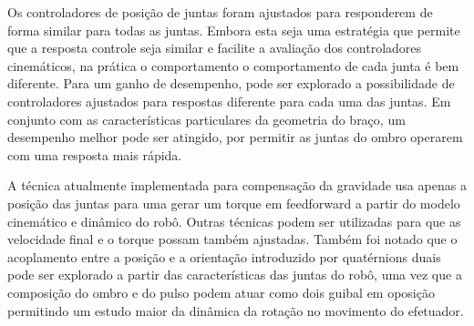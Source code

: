 Os controladores de posição de juntas foram ajustados para responderem de forma similar para todas as juntas. Embora esta seja uma estratégia que permite que a resposta controle seja similar e facilite a avaliação dos controladores cinemáticos, na prática o comportamento o comportamento de cada junta é bem diferente. Para um ganho de desempenho, pode ser explorado a possibilidade de controladores ajustados para respostas diferente para cada uma das juntas. Em conjunto com as características particulares da geometria do braço, um desempenho melhor pode ser atingido, por permitir as juntas do ombro operarem com uma resposta mais rápida.

A técnica atualmente implementada para compensação da gravidade usa apenas a posição das juntas para uma gerar um torque em feedforward a partir do modelo cinemático e dinâmico do robô. Outras técnicas podem ser utilizadas para que as velocidade final e o torque possam também ajustadas. Também foi notado que o acoplamento entre a posição e a orientação introduzido por quatérnions duais pode ser explorado a partir das características das juntas do robô, uma vez que a composição do ombro e do pulso podem atuar como dois guibal em oposição permitindo um estudo maior da dinâmica da rotação no movimento do efetuador.

